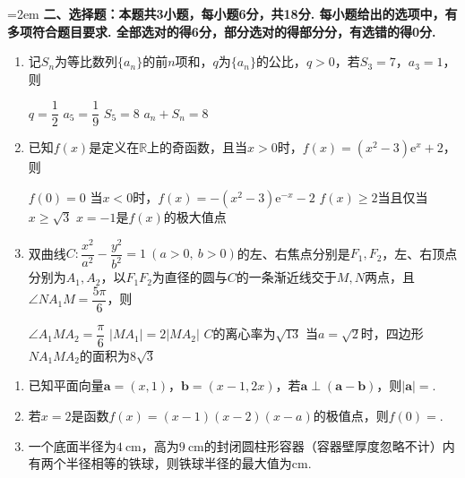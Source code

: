 \documentclass[12pt,a4paper]{article}
\begin{document}
	\vspace{0.3cm}
	\noindent\hangindent=2em {\bfseries 二、选择题：本题共3小题，每小题6分，共18分. 每小题给出的选项中，有多项符合题目要求. 全部选对的得6分，部分选对的得部分分，有选错的得0分.}
	\begin{enumerate}[leftmargin=*,label=\arabic*.,resume,itemsep=0.8ex]
		\item 记$S_n$为等比数列$\{a_n\}$的前$n$项和，$q$为$\{a_n\}$的公比，$q>0$，若$S_3=7$，$a_3=1$，则
		\begin{choicesTwo}
			\choice $q=\dfrac12$
			\choice $a_5=\dfrac19$
			\choice $S_5=8$
			\choice $a_n+S_n=8$
		\end{choicesTwo}
		\item 已知$f(x)$是定义在$\mathbb{R}$上的奇函数，且当$x>0$时，$f(x)=(x^2-3)\mathrm{e}^x+2$，则
		\begin{choicesTwo}
			\choice $f(0)=0$
			\choice 当$x<0$时，$f(x)=-(x^2-3)\mathrm{e}^{-x}-2$
			\choice $f(x)\ge2$当且仅当$x\ge\sqrt3$
			\choice $x=-1$是$f(x)$的极大值点
		\end{choicesTwo}
		\item 双曲线$C:\dfrac{x^2}{a^2}-\dfrac{y^2}{b^2}=1\ (a>0,\ b>0)$的左、右焦点分别是$F_1,F_2$，左、右顶点分别为$A_1,A_2$，以$F_1F_2$为直径的圆与$C$的一条渐近线交于$M,N$两点，且$\angle NA_1M=\dfrac{5\pi}{6}$，则
		\begin{choicesOne}
			\choice $\angle A_1MA_2=\dfrac{\pi}{6}$
			\choice $|MA_1|=2|MA_2|$
			\choice $C$的离心率为$\sqrt{13}$
			\choice 当$a=\sqrt2$时，四边形$NA_1MA_2$的面积为$8\sqrt3$
		\end{choicesOne}
	\end{enumerate}
	\vspace{0.3cm}
	\begin{enumerate}[leftmargin=*,label=\arabic*.,resume,itemsep=0.8ex]
		\item 已知平面向量$\boldsymbol{a}=(x,1)$，$\boldsymbol{b}=(x-1,2x)$，若$\boldsymbol{a}\perp(\boldsymbol{a}-\boldsymbol{b})$，则$|\boldsymbol{a}|=$\underline{\qquad\qquad}.
		\item 若$x=2$是函数$f(x)=(x-1)(x-2)(x-a)$的极值点，则$f(0)=$\underline{\qquad\qquad}.
		\item 一个底面半径为$4\ \mathrm{cm}$，高为$9\ \mathrm{cm}$的封闭圆柱形容器（容器壁厚度忽略不计）内有两个半径相等的铁球，则铁球半径的最大值为\underline{\qquad\qquad}$\mathrm{cm}$.
	\end{enumerate}
	\vspace{0.3cm}
\end{document}
